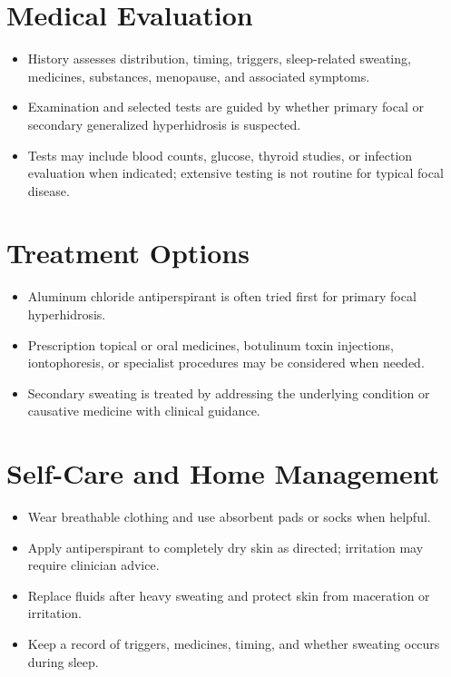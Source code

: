 \section*{Medical Evaluation}
\begin{itemize}
  \item History assesses distribution, timing, triggers, sleep-related sweating, medicines, substances, menopause, and associated symptoms.
  \item Examination and selected tests are guided by whether primary focal or secondary generalized hyperhidrosis is suspected.
  \item Tests may include blood counts, glucose, thyroid studies, or infection evaluation when indicated; extensive testing is not routine for typical focal disease.
\end{itemize}

\section*{Treatment Options}
\begin{itemize}
  \item Aluminum chloride antiperspirant is often tried first for primary focal hyperhidrosis.
  \item Prescription topical or oral medicines, botulinum toxin injections, iontophoresis, or specialist procedures may be considered when needed.
  \item Secondary sweating is treated by addressing the underlying condition or causative medicine with clinical guidance.
\end{itemize}

\section*{Self-Care and Home Management}
\begin{itemize}
  \item Wear breathable clothing and use absorbent pads or socks when helpful.
  \item Apply antiperspirant to completely dry skin as directed; irritation may require clinician advice.
  \item Replace fluids after heavy sweating and protect skin from maceration or irritation.
  \item Keep a record of triggers, medicines, timing, and whether sweating occurs during sleep.
\end{itemize}


